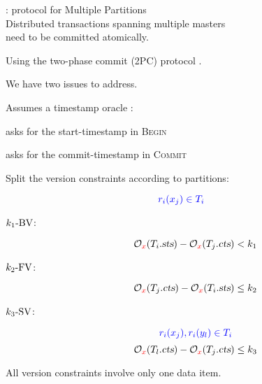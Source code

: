 \begin{frame}{}
  \begin{center}
    \rvsimp{}: \rvsi{} protocol for Multiple Partitions\\[10pt]
    Distributed transactions spanning multiple masters \\
    need to be committed atomically.

    \pause
    \vspace{0.40cm}
    Using the two-phase commit (2PC) protocol .

    \pause
    \vspace{1.00cm}
    We have two issues to address.
  \end{center}
\end{frame}

\begin{frame}{}
  Assumes a timestamp oracle :
  \begin{description}[Coordinator:]
    \item[Client:] asks for the start-timestamp in \textsc{Begin}
    \item[Coordinator:] asks for the commit-timestamp in \textsc{Commit}
  \end{description}
\end{frame}

\begin{frame}{}
  Split the \rvsi{} version constraints according to partitions:

  \[
    \textcolor{blue}{r_i(x_j) \in T_i}
  \]
  \vspace{-0.40cm}
  \begin{description}
    \item[$k_1\text{-BV}$:]
      \[
	\mathcal{O}_{\textcolor{red}{x}}(T_i.\textsl{sts}) - \mathcal{O}_{\textcolor{red}{x}}(T_j.\textsl{cts}) < k_1
      \]
    \item[$k_2\text{-FV}$:]
      \[
	\mathcal{O}_{\textcolor{red}{x}}(T_j.\textsl{cts}) - \mathcal{O}_{\textcolor{red}{x}}(T_i.\textsl{sts}) \le k_2
      \]
    \item[$k_3\text{-SV}$:]
      \[
	\textcolor{blue}{r_i(x_j), r_i(y_l) \in T_i}
      \]
      \vspace{-0.40cm}
      \[
	\mathcal{O}_{\textcolor{red}{x}}(T_l.\textsl{cts}) - \mathcal{O}_{\textcolor{red}{x}}(T_j.\textsl{cts}) \le k_3
      \]
  \end{description}

  \vspace{0.6cm}
  \centerline{All version constraints involve only one data item.}
\end{frame}
